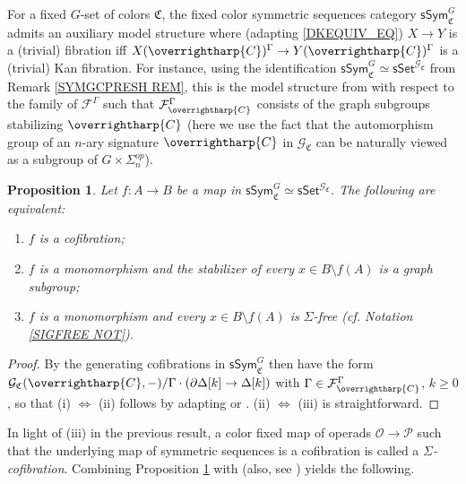 \documentclass[a4paper,10pt
,draft
]{article}%
\numberwithin{equation}{section}
\numberwithin{figure}{section}
\newtheorem{proposition}[equation]{Proposition}%
\theoremstyle{definition} %
\newcommand{\vect}[1]{\text{\overrightharp{\ensuremath{#1}}}}
\renewcommand{\O}{\ensuremath{\mathcal O}}
\newcommand{\1}{\ensuremath{\mathbbm 1}}%
\begin{document}
	For a fixed $G$-set of colors $\mathfrak{C}$,
	the 
	fixed color symmetric sequences
	category
	$\mathsf{sSym}_{\mathfrak{C}}^G$
	admits an auxiliary model structure where
	(adapting \eqref{DKEQUIV_EQ})
	$X \to Y$ is a (trivial) fibration
	iff 
	$X(\vect{C})^{\Gamma} \to Y(\vect{C})^{\Gamma}$
	is a (trivial) Kan fibration.
	For instance, using the identification
	$\mathsf{sSym}^{G}_{\mathfrak{C}}
	\simeq \mathsf{sSet}^{\mathcal{G}_{\mathfrak{C}}}$
	from Remark \ref{SYMGCPRESH REM},
	this is the model structure
	from \cite[Prop. 3.17]{BP_HGOP}
	with respect to the family of 
	$\mathcal{F}^{\Gamma}$
	such that
	$\mathcal{F}^{\Gamma}_{\vect{C}}$
	consists of the graph subgroups stabilizing $\vect{C}$
	(here we use the fact that the automorphism group of 
	an $n$-ary signature $\vect{C}$ in 
	$\mathcal{G}_{\mathfrak{C}}$
	can be naturally viewed as a subgroup of 
	$G \times \Sigma_n^{op}$).




\begin{proposition}\label{SSYMCOFCH PROP}
	Let $f \colon A \to B$ be a map in
	$\mathsf{sSym}^G_{\mathfrak{C}} \simeq \mathsf{sSet}^{\mathcal{G}_{\mathfrak{C}}}$.
	The following are equivalent:
\begin{enumerate}
	\item[(i)] $f$ is a cofibration;
	\item[(ii)] $f$ is a monomorphism and the stabilizer of every
	$x \in B \setminus f(A)$
	is a graph subgroup;
	\item[(iii)] $f$ is a monomorphism and every 
	$x \in B \setminus f(A)$ is $\Sigma$-free
	(cf. Notation \ref{SIGFREE NOT}).
\end{enumerate}
\end{proposition}

\begin{proof}
By \cite[Rem. 3.14]{BP_HGOP}
the generating cofibrations in 
$\mathsf{sSym}^G_{\mathfrak{C}}$
then have the form
$\mathcal{G}_{\mathfrak{C}}
(\vect{C},-)/\Gamma \cdot (\partial \Delta[k] \to \Delta[k])$
with $\Gamma \in \mathcal{F}^{\Gamma}_{\vect{C}}$,
$k \geq 0$,
so that (i) $\Leftrightarrow$ (ii)
follows by adapting 
\cite[Prop. 2.16]{Ste16}
or
\cite[Prop. 6.5]{Per18}.
(ii) $\Leftrightarrow$ (iii)
is straightforward.
\end{proof}



In light of (iii) in the previous result,
a color fixed map of operads
$\O \to \mathcal{P}$
such that the underlying map of symmetric sequences is a cofibration
is called a \emph{$\Sigma$-cofibration}.
%
Combining Proposition \ref{SSYMCOFCH PROP} with \cite[Prop. 3.63]{BP_HGOP} (also, see 
\cite[Prop. 4.11(ii)]{BP_HGOP})
yields the following.
\end{document}
